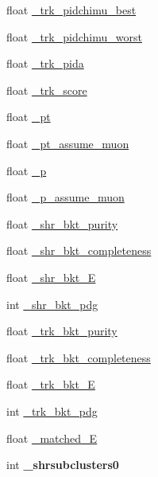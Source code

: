 \begin{DoxyCompactItemize}
\item 
float \hyperlink{classselection_1_1CC0piNpSelection_a04216d0564f79f3c4a267130cd70e753}{\+\_\+trk\+\_\+pidchimu\+\_\+best}
\item 
float \hyperlink{classselection_1_1CC0piNpSelection_a9e88e0ae759d19106d964c13926fba4b}{\+\_\+trk\+\_\+pidchimu\+\_\+worst}
\item 
float \hyperlink{classselection_1_1CC0piNpSelection_af0fe49227e33b3f46015a821de58ba1f}{\+\_\+trk\+\_\+pida}
\item 
float \hyperlink{classselection_1_1CC0piNpSelection_a72517a224dc19f95faef3efde9a999d1}{\+\_\+trk\+\_\+score}
\item 
float \hyperlink{classselection_1_1CC0piNpSelection_a98281b58b33ff8c03fa9b00f3f3baa06}{\+\_\+pt}
\item 
float \hyperlink{classselection_1_1CC0piNpSelection_a4213e006ba267c2ff55415cc9ef07bf8}{\+\_\+pt\+\_\+assume\+\_\+muon}
\item 
float \hyperlink{classselection_1_1CC0piNpSelection_afae64b232d6b3526032b289c91b092cb}{\+\_\+p}
\item 
float \hyperlink{classselection_1_1CC0piNpSelection_a2e861bf5b394c18e24f58d9fef5c33a5}{\+\_\+p\+\_\+assume\+\_\+muon}
\item 
float \hyperlink{classselection_1_1CC0piNpSelection_a1da68886d5b7a5b4eb1785649c48e8ef}{\+\_\+shr\+\_\+bkt\+\_\+purity}
\item 
float \hyperlink{classselection_1_1CC0piNpSelection_ac3c3c9895ca501c3b73f14addfddf495}{\+\_\+shr\+\_\+bkt\+\_\+completeness}
\item 
float \hyperlink{classselection_1_1CC0piNpSelection_aa1a21f48d99a4de5f1d444aa3d64dedf}{\+\_\+shr\+\_\+bkt\+\_\+E}
\item 
int \hyperlink{classselection_1_1CC0piNpSelection_aab09f93d7cd57031de714956414f3230}{\+\_\+shr\+\_\+bkt\+\_\+pdg}
\item 
float \hyperlink{classselection_1_1CC0piNpSelection_a39a84b873306f200a2350b4804429791}{\+\_\+trk\+\_\+bkt\+\_\+purity}
\item 
float \hyperlink{classselection_1_1CC0piNpSelection_aab22ce289e2d4a109440369e30fddf52}{\+\_\+trk\+\_\+bkt\+\_\+completeness}
\item 
float \hyperlink{classselection_1_1CC0piNpSelection_aa7a6076f1169185e0b2b02fbb03aba22}{\+\_\+trk\+\_\+bkt\+\_\+E}
\item 
int \hyperlink{classselection_1_1CC0piNpSelection_a7044de37ee4f3615ffe4bb15e9f00f8e}{\+\_\+trk\+\_\+bkt\+\_\+pdg}
\item 
float \hyperlink{classselection_1_1CC0piNpSelection_ac75aa3ac33061bbdd378594ee7e6e2e5}{\+\_\+matched\+\_\+E}
\item 
int {\bfseries \+\_\+shrsubclusters0}\hypertarget{classselection_1_1CC0piNpSelection_a670d3708a1060017b414acd416c02b5c}{}\label{classselection_1_1CC0piNpSelection_a670d3708a1060017b414acd416c02b5c}


\end{DoxyCompactItemize}
